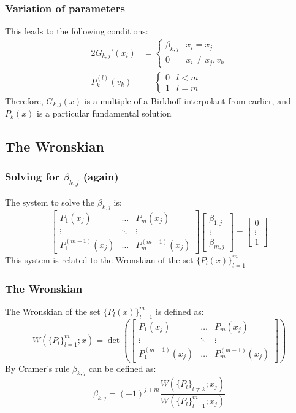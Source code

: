\documentclass{beamer}
\begin{document}
\begin{frame}
\frametitle{Variation of parameters}
This leads to the following conditions:
\begin{alignat*}{2}
G_{k,j}'(x_i) & = \begin{cases} \beta_{k,j} & x_i = x_j \\ 0 & x_i \neq x_j, v_k \end{cases} \\
P_k^{(l)}(v_k) & = \begin{cases} 0 & l < m \\ 1 & l =m \end{cases}
\end{alignat*}
Therefore, $G_{k,j}(x)$ is a multiple of a Birkhoff interpolant from earlier, and $P_k(x)$ is a particular fundamental solution
\end{frame}

\subsection{The Wronskian}

\begin{frame}
\frametitle{Solving for $\beta_{k,j}$ (again)}
The system to solve the $\beta_{k,j}$ is:
\begin{equation*}
\begin{bmatrix} P_1(x_j) & \dots & P_m(x_j) \\
\vdots & \ddots & \vdots \\
P_1^{(m-1)}(x_j) & \dots & P_m^{(m-1)}(x_j) \end{bmatrix}
\begin{bmatrix} \beta_{1,j} \\ \vdots \\ \beta_{m,j} \end{bmatrix} = 
\begin{bmatrix} 0 \\ \vdots \\ 1 \end{bmatrix}
\end{equation*}
This system is related to the Wronskian of the set $\{ P_l(x) \}_{l=1}^m$
\end{frame}

\begin{frame}
\frametitle{The Wronskian}
The Wronskian of the set $\{ P_l(x) \}_{l=1}^m$ is defined as:
\begin{equation*}
W(\{P_l\}_{l=1}^m ; x) = \det \left ( \begin{bmatrix} P_1(x_j) & \dots & P_m(x_j) \\
\vdots & \ddots & \vdots \\
P_1^{(m-1)}(x_j) & \dots & P_m^{(m-1)}(x_j) \end{bmatrix} \right )
\end{equation*}
By Cramer's rule $\beta_{k,j}$ can be defined as:
\begin{equation*}
\beta_{k,j} = (-1)^{j + m} \frac{ W(\{P_l\}_{l \neq k} ; x_j ) }{ W(\{P_l\}_{l=1}^m ; x_j ) }
\end{equation*}
\end{frame}
\end{document}
